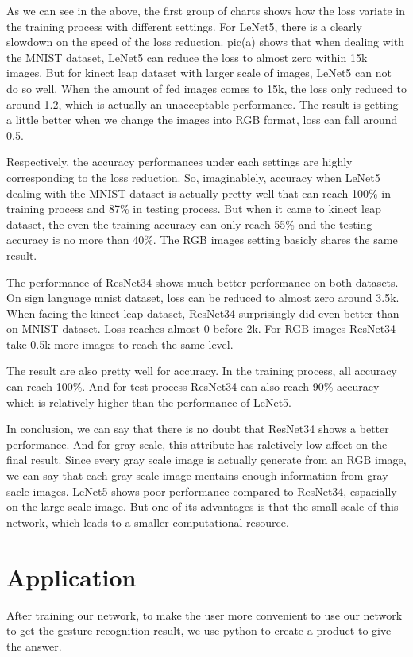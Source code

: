 \documentclass[12pt]{article}
\begin{document}
As we can see in the above, the first group of charts shows how the loss variate in the training process with different settings. For LeNet5, there is a clearly slowdown on the speed of the loss reduction. pic(a) shows that when dealing with the MNIST dataset, LeNet5 can reduce the loss to almost zero within 15k images. But for kinect leap dataset with larger scale of images, LeNet5 can not do so well. When the amount of fed images comes to 15k, the loss only reduced to around 1.2, which is actually an unacceptable performance. The result is getting a little better when we change the images into RGB format, loss can fall around 0.5. 

Respectively, the accuracy performances under each settings are highly corresponding to the loss reduction. So, imaginablely, accuracy when LeNet5 dealing with the MNIST dataset is actually pretty well that can reach 100\% in training process and 87\% in testing process. But when it came to kinect leap dataset, the even the training accuracy can only reach 55\% and the testing accuracy is no more than 40\%. The RGB images setting basicly shares the same result. 

The performance of ResNet34 shows much better performance on both datasets. On sign language mnist dataset, loss can be reduced to almost zero around 3.5k. When facing the kinect leap dataset, ResNet34 surprisingly did even better than on MNIST dataset. Loss reaches almost 0 before 2k. For RGB images ResNet34 take 0.5k more images to reach the same level.

The result are also pretty well for accuracy. In the training process, all accuracy can reach 100\%. And for test process ResNet34 can also reach 90\% accuracy which is relatively higher than the performance of LeNet5.

In conclusion, we can say that there is no doubt that ResNet34 shows a better performance. And for gray scale, this attribute has raletively low affect on the final result. Since every gray scale image is actually generate from an RGB image, we can say that each gray scale image mentains enough information from gray sacle images. LeNet5 shows poor performance compared to ResNet34, espacially on the large scale image. But one of its advantages is that the small scale of this network, which leads to a smaller computational resource.

\section{Application}
After training our network, to make the user more convenient to use our network to get the gesture recognition result, we use python to create a product to give the answer.
\end{document}

